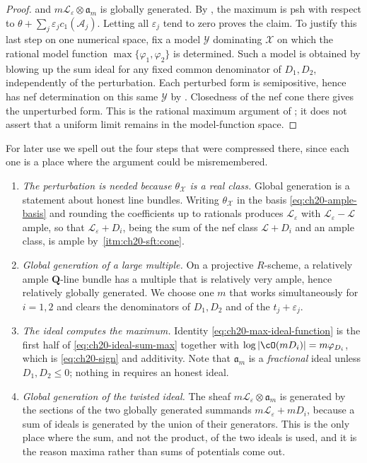 \begin{proof}
and \(m\mathcal L_\varepsilon\otimes\mathfrak a_m\) is globally
generated.  By , the maximum is psh with
respect to
\(\theta+\sum_j\varepsilon_jc_1(\mathcal A_j)\).  Letting all
\(\varepsilon_j\) tend to zero proves the claim.  To justify this last
step on one numerical space, fix a model \(\mathcal Y\) dominating
\(\mathcal X\) on which the rational model function
\(\max\{\varphi_1,\varphi_2\}\) is determined.  Such a model is obtained
by blowing up the sum ideal for any fixed common denominator of
\(D_1,D_2\), independently of the perturbation.  Each perturbed form is
semipositive, hence has nef determination on this same \(\mathcal Y\)
by .  Closedness of the nef
cone there gives the unperturbed form.  This is the rational maximum
argument of \cite[Proposition 5.8]{BFJ16}; it does not assert that a
uniform limit remains in the model-function space.
\end{proof}

For later use we spell out the four steps that were compressed there, since
each one is a place where the argument could be misremembered.

\begin{enumerate}
\item \emph{The perturbation is needed because \(\theta_{\mathcal X}\) is a
 real class.}  Global generation is a statement about honest line bundles.
 Writing \(\theta_{\mathcal X}\) in the basis \eqref{eq:ch20-ample-basis}
 and rounding the coefficients up to rationals produces
 \(\mathcal L_\varepsilon\) with \(\mathcal L_\varepsilon-\mathcal L\)
 ample, so that \(\mathcal L_\varepsilon+D_i\), being the sum of the nef
 class \(\mathcal L+D_i\) and an ample class, is ample by
 \,\cref{itm:ch20-sft:cone}.
\item \emph{Global generation of a large multiple.}  On a projective
 \(R\)-scheme, a relatively ample \(\mathbf Q\)-line bundle has a multiple
 that is relatively very ample, hence relatively globally generated.  We
 choose one \(m\) that works simultaneously for \(i=1,2\) and clears the
 denominators of \(D_1,D_2\) and of the \(t_j+\varepsilon_j\).
\item \emph{The ideal computes the maximum.}  Identity
 \eqref{eq:ch20-max-ideal-function} is the first half of
 \eqref{eq:ch20-ideal-sum-max} together with
 \(\log|\cO(mD_i)|=m\varphi_{D_i}\), which is
 \eqref{eq:ch20-sign} and additivity.  Note that
 \(\mathfrak a_m\) is a \emph{fractional} ideal unless \(D_1,D_2\leq0\);
 nothing in  requires an honest ideal.
\item \emph{Global generation of the twisted ideal.}  The sheaf
 \(m\mathcal L_\varepsilon\otimes\mathfrak a_m\) is generated by the
 sections of the two globally generated summands
 \(m\mathcal L_\varepsilon+mD_i\), because a sum of ideals is generated by
 the union of their generators.  This is the only place where the sum, and
 not the product, of the two ideals is used, and it is the reason maxima
 rather than sums of potentials come out.
\end{enumerate}

